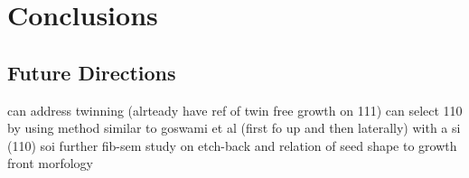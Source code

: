 \chapter{Conclusions}
\label{chap:conclusions}
\section{Future Directions}
can address twinning (alrteady have ref of twin free growth on 111)
can select 110 by using method similar to goswami et al (first fo up and then laterally) with a si (110) soi
further fib-sem study on etch-back and relation of seed shape to growth front morfology